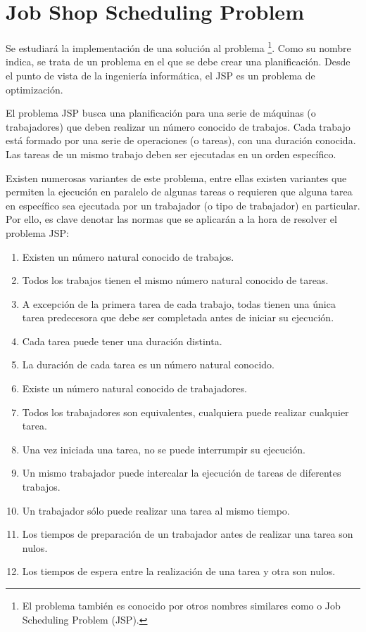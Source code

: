 
\section{Job Shop Scheduling Problem}

Se estudiará la implementación de una solución al problema
 \cite{Yan77}
\footnote{El problema también es conocido por otros nombres similares
como  o Job Scheduling Problem (JSP).}.
Como su nombre indica, se trata de un problema en el que se debe
crear una planificación.
Desde el punto de vista de la ingeniería informática,
el JSP es un problema de optimización.

El problema JSP busca una planificación para una serie de
máquinas (o trabajadores) que deben realizar un número conocido
de trabajos.
Cada trabajo está formado por una serie de operaciones (o tareas),
con una duración conocida.
Las tareas de un mismo trabajo deben ser ejecutadas en un orden específico.

Existen numerosas variantes de este problema,
entre ellas existen variantes que permiten la ejecución
en paralelo de algunas tareas o requieren que alguna tarea
en específico sea ejecutada por un trabajador (o tipo de trabajador)
en particular.
Por ello, es clave denotar las normas que se aplicarán a la hora de resolver
el problema JSP:

\begin{enumerate}[itemsep=0.25px]
    \item Existen un número natural conocido de trabajos.
    \item Todos los trabajos tienen el mismo número natural conocido de tareas.
    \item A excepción de la primera tarea de cada trabajo,
    todas tienen una única tarea predecesora que debe ser completada
    antes de iniciar su ejecución.
    \item Cada tarea puede tener una duración distinta.
    \item La duración de cada tarea es un número natural conocido.
    \item Existe un número natural conocido de trabajadores.
    \item Todos los trabajadores son equivalentes,
    cualquiera puede realizar cualquier tarea.
    \item Una vez iniciada una tarea, no se puede interrumpir su ejecución.
    \item Un mismo trabajador puede intercalar la ejecución de tareas de diferentes trabajos.
    \item Un trabajador sólo puede realizar una tarea al mismo tiempo.
    \item Los tiempos de preparación de un trabajador antes de realizar una tarea son nulos.
    \item Los tiempos de espera entre la realización de una tarea y otra son nulos.
\end{enumerate}

